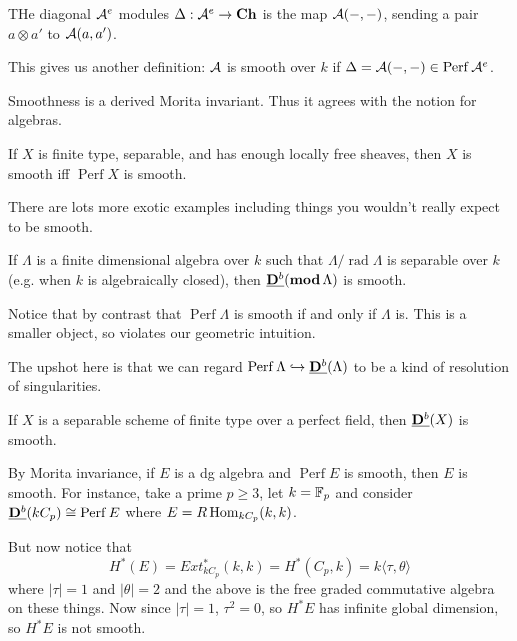 \documentclass[12pt]{article}
\begin{document}
\begin{ex}
THe diagonal $\mathcal{A}^e$ modules $\Delta:\mathcal{A}^e\to\operatorname{\mathbf{Ch}}$ is the map $\mathcal{A}(-,-)$, sending a pair $a\otimes a'$ to $\mathcal{A}(a,a')$.
\end{ex}
\begin{rmk}
	This gives us another definition: $\mathcal{A}$ is smooth over $k$ if $\Delta=\mathcal{A}(-,-)\in\operatorname{Perf}\mathcal{A}^e$.
\end{rmk}
\begin{lem}
	Smoothness is a derived Morita invariant. Thus it agrees with the notion for algebras.
\end{lem}
\begin{thm}
	If $X$ is finite type, separable, and has enough locally free sheaves, then $X$ is smooth iff $\operatorname{Perf}X$ is smooth.
\end{thm}

There are lots more exotic examples including things you wouldn't really expect to be smooth.
\begin{thm}
	If $\Lambda$ is a finite dimensional algebra over $k$ such that $\Lambda/\operatorname{rad}\Lambda$ is separable over $k$ (e.g. when $k$ is algebraically closed), then 
	$\underline{\mathbf{D}^b}(\mathbf{mod}\,\Lambda)$ is smooth.
\end{thm}
\begin{rmk}
	Notice that by contrast that $\operatorname{Perf}\Lambda$ is smooth if and only if $\Lambda$ is. This is a smaller object, so violates our geometric intuition.

	The upshot here is that we can regard $\operatorname{Perf}\Lambda\hookrightarrow\underline{\mathbf{D}^b}(\Lambda)$ to be a kind of resolution of singularities.
\end{rmk}
\begin{thm}[Lunts]
	If $X$ is a separable scheme of finite type over a perfect field, then $\underline{\mathbf{D}^b}(X)$ is smooth.
\end{thm}
By Morita invariance, if $E$ is a dg algebra and $\operatorname{Perf}E$ is smooth, then $E$ is smooth. For instance, take a prime $p\ge 3$, let $k=\mathbb{F}_p$
and consider $\underline{\mathbf{D}^b}(k C_p)\cong\operatorname{Perf}E$ where $E=R\operatorname{Hom}_{kC_p}(k,k)$.

But now notice that
\[H^\ast(E)=Ext_{k C_p}^\ast(k,k)=H^\ast(C_p,k)=k\langle\tau,\theta\rangle\]
where $|\tau|=1$ and $|\theta|=2$ and the above is the free graded commutative algebra on these things. Now since $|\tau|=1$, $\tau^2=0$, so $H^\ast E$ has infinite global dimension, so $H^\ast E$ is not smooth.
\end{document}
